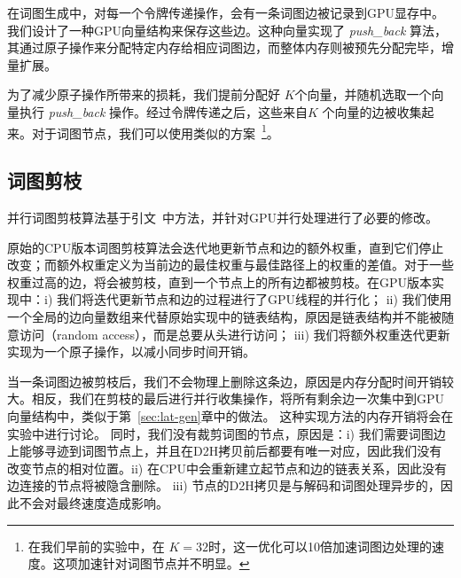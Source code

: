 
在词图生成中，对每一个令牌传递操作，会有一条词图边被记录到GPU显存中。我们设计了一种GPU向量结构来保存这些边。这种向量实现了  {\em{push\_back}} 算法，其通过原子操作来分配特定内存给相应词图边，而整体内存则被预先分配完毕，增量扩展。

为了减少原子操作所带来的损耗，我们提前分配好 $K$个向量，并随机选取一个向量执行 {\em{push\_back}} 操作。经过令牌传递之后，这些来自$K$ 个向量的边被收集起来。对于词图节点，我们可以使用类似的方案~\footnote{在我们早前的实验中，在 $K=32$时，这一优化可以10倍加速词图边处理的速度。这项加速针对词图节点并不明显。}。



\subsection{词图剪枝}

并行词图剪枝算法基于引文~\cite{ljolje1999efficient,povey2012generating}中方法，并针对GPU并行处理进行了必要的修改。

原始的CPU版本词图剪枝算法会迭代地更新节点和边的额外权重，直到它们停止改变；而额外权重定义为当前边的最佳权重与最佳路径上的权重的差值。对于一些权重过高的边，将会被剪枝，直到一个节点上的所有边都被剪枝。在GPU版本实现中：i) 我们将迭代更新节点和边的过程进行了GPU线程的并行化；
ii) 我们使用一个全局的边向量数组来代替原始实现中的链表结构，原因是链表结构并不能被随意访问（random access），而是总要从头进行访问；
iii) 我们将额外权重迭代更新实现为一个原子操作，以减小同步时间开销。

 当一条词图边被剪枝后，我们不会物理上删除这条边，原因是内存分配时间开销较大。相反，我们在剪枝的最后进行并行收集操作，将所有剩余边一次集中到GPU向量结构中，类似于第~\ref{sec:lat-gen}章中的做法。 这种实现方法的内存开销将会在实验中进行讨论。
同时，我们没有裁剪词图的节点，原因是：i) 我们需要词图边上能够寻迹到词图节点上，并且在D2H拷贝前后都要有唯一对应，因此我们没有改变节点的相对位置。ii) 在CPU中会重新建立起节点和边的链表关系，因此没有边连接的节点将被隐含删除。 iii)  节点的D2H拷贝是与解码和词图处理异步的，因此不会对最终速度造成影响。


